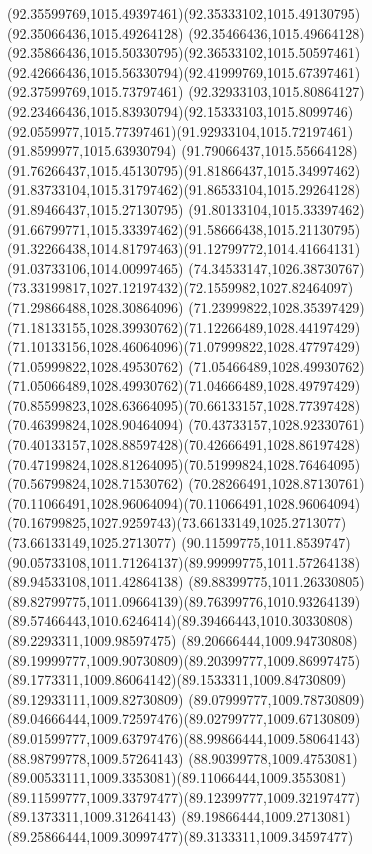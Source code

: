 {{	\curveto(92.35599769,1015.49397461)(92.35333102,1015.49130795)(92.35066436,1015.49264128)
	\curveto(92.35466436,1015.49664128)(92.35866436,1015.50330795)(92.36533102,1015.50597461)
	\curveto(92.42666436,1015.56330794)(92.41999769,1015.67397461)(92.37599769,1015.73797461)
	\curveto(92.32933103,1015.80864127)(92.23466436,1015.83930794)(92.15333103,1015.8099746)
	\curveto(92.0559977,1015.77397461)(91.92933104,1015.72197461)(91.8599977,1015.63930794)
	\curveto(91.79066437,1015.55664128)(91.76266437,1015.45130795)(91.81866437,1015.34997462)
	\curveto(91.83733104,1015.31797462)(91.86533104,1015.29264128)(91.89466437,1015.27130795)
	\curveto(91.80133104,1015.33397462)(91.66799771,1015.33397462)(91.58666438,1015.21130795)
	\curveto(91.32266438,1014.81797463)(91.12799772,1014.41664131)(91.03733106,1014.00997465)
	\lineto(74.34533147,1026.38730767)
	\curveto(73.33199817,1027.12197432)(72.1559982,1027.82464097)(71.29866488,1028.30864096)
	\curveto(71.23999822,1028.35397429)(71.18133155,1028.39930762)(71.12266489,1028.44197429)
	\curveto(71.10133156,1028.46064096)(71.07999822,1028.47797429)(71.05999822,1028.49530762)
	\curveto(71.05466489,1028.49930762)(71.05066489,1028.49930762)(71.04666489,1028.49797429)
	\curveto(70.85599823,1028.63664095)(70.66133157,1028.77397428)(70.46399824,1028.90464094)
	\curveto(70.43733157,1028.92330761)(70.40133157,1028.88597428)(70.42666491,1028.86197428)
	\curveto(70.47199824,1028.81264095)(70.51999824,1028.76464095)(70.56799824,1028.71530762)
	\curveto(70.28266491,1028.87130761)(70.11066491,1028.96064094)(70.11066491,1028.96064094)
	\curveto(70.16799825,1027.9259743)(73.66133149,1025.2713077)(73.66133149,1025.2713077)
	\lineto(90.11599775,1011.8539747)
	\curveto(90.05733108,1011.71264137)(89.99999775,1011.57264138)(89.94533108,1011.42864138)
	\curveto(89.88399775,1011.26330805)(89.82799775,1011.09664139)(89.76399776,1010.93264139)
	\curveto(89.57466443,1010.6246414)(89.39466443,1010.30330808)(89.2293311,1009.98597475)
	\curveto(89.20666444,1009.94730808)(89.19999777,1009.90730809)(89.20399777,1009.86997475)
	\curveto(89.1773311,1009.86064142)(89.1533311,1009.84730809)(89.12933111,1009.82730809)
	\curveto(89.07999777,1009.78730809)(89.04666444,1009.72597476)(89.02799777,1009.67130809)
	\curveto(89.01599777,1009.63797476)(88.99866444,1009.58064143)(88.98799778,1009.57264143)
	\curveto(88.90399778,1009.4753081)(89.00533111,1009.3353081)(89.11066444,1009.3553081)
	\curveto(89.11599777,1009.33797477)(89.12399777,1009.32197477)(89.1373311,1009.31264143)
	\curveto(89.19866444,1009.2713081)(89.25866444,1009.30997477)(89.3133311,1009.34597477)
}}
